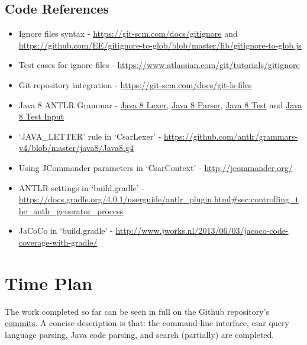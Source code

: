 \documentclass[12pt, letterpaper, oneside]{article}
\begin{document}
\subsection{Code References}
\begin{itemize}
    \item Ignore files syntax - \url{https://git-scm.com/docs/gitignore} and \url{https://github.com/EE/gitignore-to-glob/blob/master/lib/gitignore-to-glob.js}
    \item Test cases for ignore files - \url{https://www.atlassian.com/git/tutorials/gitignore}
    \item Git repository integration - \url{https://git-scm.com/docs/git-ls-files}
    \item Java 8 ANTLR Grammar - \href{https://github.com/antlr/grammars-v4/blob/02711067f82bed8e0c8dfd25e80f4f8ae2472abd/java8-pt/JavaLexer.g4}{Java 8 Lexer}, \href{https://github.com/antlr/grammars-v4/blob/02711067f82bed8e0c8dfd25e80f4f8ae2472abd/java8-pt/JavaParser.g4}{Java 8 Parser}, \href{https://github.com/antlr/grammars-v4/blob/02711067f82bed8e0c8dfd25e80f4f8ae2472abd/_grammar-test/src/test/java/TestJava8pt.java}{Java 8 Test} and \href{https://github.com/antlr/grammars-v4/blob/02711067f82bed8e0c8dfd25e80f4f8ae2472abd/java8-pt/examples/AllInOne8.java}{Java 8 Test Input}
    \item `JAVA\_LETTER' rule in `CsarLexer' - \url{https://github.com/antlr/grammars-v4/blob/master/java8/Java8.g4}
    \item Using JCommander parameters in `CsarContext' - \url{http://jcommander.org/}
    \item ANTLR settings in `build.gradle' - \url{https://docs.gradle.org/4.0.1/userguide/antlr\_plugin.html\#sec:controlling\_the\_antlr\_generator\_process}
    \item JaCoCo in `build.gradle' - \url{http://www.jworks.nl/2013/06/03/jacoco-code-coverage-with-gradle/}
\end{itemize}

\section{Time Plan}
The work completed so far can be seen in full on the Github repository's \href{https://github.research.its.qmul.ac.uk/ec15116/csar/commits/master}{commits}.
A concise description is that: the command-line interface, csar query language parsing, Java code parsing, and search (partially) are completed.
\end{document}
